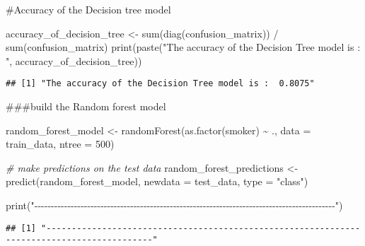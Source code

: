 \documentclass[
]{article}
\newenvironment{Shaded}{\begin{snugshade}}{\end{snugshade}}
\newcommand{\AttributeTok}[1]{\textcolor[rgb]{0.77,0.63,0.00}{#1}}
\newcommand{\CommentTok}[1]{\textcolor[rgb]{0.56,0.35,0.01}{\textit{#1}}}
\newcommand{\DecValTok}[1]{\textcolor[rgb]{0.00,0.00,0.81}{#1}}
\newcommand{\FunctionTok}[1]{\textcolor[rgb]{0.00,0.00,0.00}{#1}}
\newcommand{\NormalTok}[1]{#1}
\newcommand{\OtherTok}[1]{\textcolor[rgb]{0.56,0.35,0.01}{#1}}
\newcommand{\SpecialCharTok}[1]{\textcolor[rgb]{0.00,0.00,0.00}{#1}}
\newcommand{\StringTok}[1]{\textcolor[rgb]{0.31,0.60,0.02}{#1}}
\begin{document}
\#Accuracy of the Decision tree model

\begin{Shaded}
\begin{Highlighting}[]
\NormalTok{accuracy\_of\_decision\_tree }\OtherTok{\textless{}{-}} \FunctionTok{sum}\NormalTok{(}\FunctionTok{diag}\NormalTok{(confusion\_matrix)) }\SpecialCharTok{/} \FunctionTok{sum}\NormalTok{(confusion\_matrix)}
\FunctionTok{print}\NormalTok{(}\FunctionTok{paste}\NormalTok{(}\StringTok{"The accuracy of the Decision Tree model is : "}\NormalTok{, accuracy\_of\_decision\_tree))}
\end{Highlighting}
\end{Shaded}

\begin{verbatim}
## [1] "The accuracy of the Decision Tree model is :  0.8075"
\end{verbatim}

\#\#\#build the Random forest model

\begin{Shaded}
\begin{Highlighting}[]
\NormalTok{random\_forest\_model }\OtherTok{\textless{}{-}} \FunctionTok{randomForest}\NormalTok{(}\FunctionTok{as.factor}\NormalTok{(smoker) }\SpecialCharTok{\textasciitilde{}}\NormalTok{ ., }\AttributeTok{data =}\NormalTok{ train\_data, }\AttributeTok{ntree =} \DecValTok{500}\NormalTok{)}

\CommentTok{\# make predictions on the test data}
\NormalTok{random\_forest\_predictions }\OtherTok{\textless{}{-}} \FunctionTok{predict}\NormalTok{(random\_forest\_model, }\AttributeTok{newdata =}\NormalTok{ test\_data, }\AttributeTok{type =} \StringTok{"class"}\NormalTok{)}

\FunctionTok{print}\NormalTok{(}\StringTok{"{-}{-}{-}{-}{-}{-}{-}{-}{-}{-}{-}{-}{-}{-}{-}{-}{-}{-}{-}{-}{-}{-}{-}{-}{-}{-}{-}{-}{-}{-}{-}{-}{-}{-}{-}{-}{-}{-}{-}{-}{-}{-}{-}{-}{-}{-}{-}{-}{-}{-}{-}{-}{-}{-}{-}{-}{-}{-}{-}{-}{-}{-}{-}{-}{-}{-}{-}{-}{-}{-}{-}{-}{-}{-}{-}{-}{-}{-}{-}{-}{-}{-}{-}{-}{-}{-}{-}{-}{-}{-}{-}"}\NormalTok{)}
\end{Highlighting}
\end{Shaded}

\begin{verbatim}
## [1] "-------------------------------------------------------------------------------------------"
\end{verbatim}

\begin{Shaded}
\end{Shaded}
\end{document}
